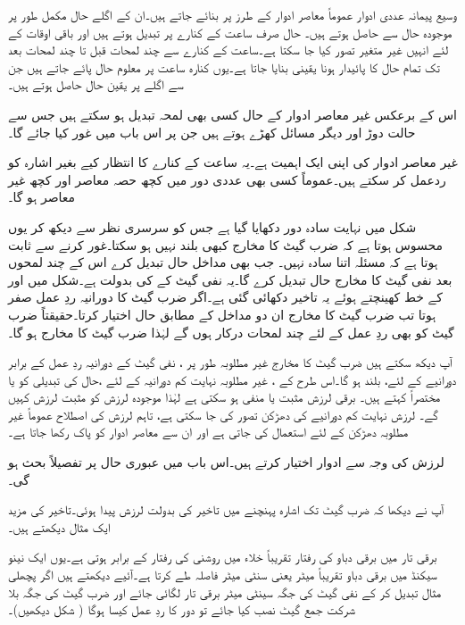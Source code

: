 وسیع پیمانہ عددی ادوار عموماً معاصر  ادوار کے  طرز پر بنائے جاتے ہیں۔ان کے اگلے حال مکمل طور  پر  موجودہ حال سے  حاصل ہوتے ہیں۔ حال صرف ساعت کے کنارے پر تبدیل ہوتے ہیں اور باقی  اوقات کے لئے  انہیں غیر متغیر تصور کیا جا سکتا ہے۔ساعت کے کنارے سے چند لمحات قبل  تا  چند لمحات بعد تک       تمام حال کا   پائیدار  ہونا  یقینی بنایا جاتا ہے۔یوں کنارہ  ساعت    پر  معلوم حال پائے جاتے ہیں جن سے اگلے  پر  یقین حال  حاصل  ہوتے ہیں۔ 

اس کے برعکس غیر معاصر ادوار کے حال کسی بھی لمحہ تبدیل ہو سکتے ہیں جس سے حالت  دوڑ اور دیگر مسائل کھڑے ہوتے ہیں جن پر اس باب میں غور کیا جائے گا۔

غیر معاصر ادوار کی اپنی ایک اہمیت ہے۔یہ ساعت کے کنارے کا انتظار کیے بغیر اشارہ  کو ردعمل کر سکتے ہیں۔عموماً کسی بھی عددی دور میں کچھ حصہ معاصر اور کچھ غیر معاصر ہو گا۔

شکل میں نہایت سادہ دور دکھایا گیا ہے جس کو سرسری نظر سے    دیکھ کر  یوں محسوس ہوتا ہے کہ ضرب گیٹ کا  مخارج کبھی بلند نہیں ہو سکتا۔غور کرنے سے ثابت ہوتا ہے کہ مسئلہ اتنا سادہ نہیں۔ جب بھی مداخل   حال تبدیل کرے  اس کے  چند لمحوں بعد نفی گیٹ کا مخارج حال تبدیل کرے گا۔یہ  نفی گیٹ کے   کی بدولت ہے۔شکل میں   اور   کے خط کھینچتے ہوئے یہ    تاخیر دکھائی گئی ہے۔اگر ضرب گیٹ کا دورانیہ ردِ عمل صفر ہوتا تب ضرب گیٹ کا مخارج ان دو مداخل کے مطابق حال   اختیار کرتا۔حقیقتاً  ضرب گیٹ کو بھی ردِ عمل کے لئے چند لمحات درکار ہوں گے لہٰذا ضرب گیٹ کا مخارج   ہو گا۔

آپ دیکھ سکتے ہیں  ضرب گیٹ کا مخارج غیر مطلوبہ طور پر ، نفی گیٹ کے دورانیہ ردِ عمل کے برابر  دورانیے کے لئے، بلند ہو گا۔اس طرح کے  ، غیر مطلوبہ نہایت کم دورانیہ کے لئے ،حال کی تبدیلی کو یا مختصراً     کہتے ہیں۔ برقی لرزش مثبت یا منفی ہو سکتی ہے لہٰذا موجودہ لرزش کو مثبت لرزش کہیں گے۔  لرزش  نہایت کم دورانیے کی دھڑکن تصور کی جا سکتی ہے، تاہم  لرزش کی اصطلاح عموماً غیر مطلوبہ  دھڑکن کے لئے استعمال کی جاتی ہے  اور ان  سے معاصر ادوار   کو پاک رکھا جاتا ہے۔

 لرزش کی وجہ سے ادوار    اختیار کرتے ہیں۔اس باب میں عبوری حال   پر تفصیلاً بحث ہو گی۔  

آپ نے دیکھا کہ ضرب گیٹ تک   اشارہ  پہنچنے میں تاخیر کی بدولت لرزش پیدا ہوئی۔تاخیر کی مزید  ایک  مثال دیکھتے ہیں۔

برقی تار میں برقی دباو کی رفتار تقریباً خلاء میں روشنی کی  رفتار کے برابر ہوتی ہے۔یوں ایک نینو      سیکنڈ  میں برقی دباو تقریباً   میٹر یعنی  سنٹی میٹر فاصلہ طے کرتا ہے۔آئیے دیکھتے ہیں  اگر پچھلی مثال  تبدیل کر کے نفی گیٹ کی جگہ   سینٹی میٹر برقی تار لگائی جائے اور ضرب گیٹ کی جگہ بلا شرکت جمع گیٹ نصب کیا جائے تو دور کا ردِ عمل کیسا ہوگا ( شکل دیکھیں)۔



